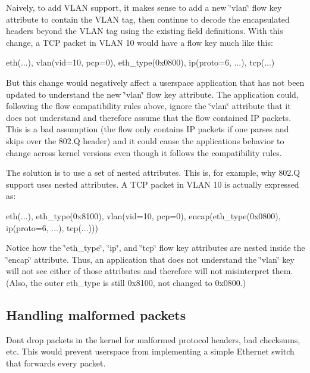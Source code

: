 Naively, to add V\+L\+A\+N support, it makes sense to add a new \char`\"{}vlan\char`\"{} flow key attribute to contain the V\+L\+A\+N tag, then continue to decode the encapsulated headers beyond the V\+L\+A\+N tag using the existing field definitions. With this change, a T\+C\+P packet in V\+L\+A\+N 10 would have a flow key much like this\+: \begin{DoxyVerb}eth(...), vlan(vid=10, pcp=0), eth_type(0x0800), ip(proto=6, ...), tcp(...)
\end{DoxyVerb}


But this change would negatively affect a userspace application that has not been updated to understand the new \char`\"{}vlan\char`\"{} flow key attribute. The application could, following the flow compatibility rules above, ignore the \char`\"{}vlan\char`\"{} attribute that it does not understand and therefore assume that the flow contained I\+P packets. This is a bad assumption (the flow only contains I\+P packets if one parses and skips over the 802.\+Q header) and it could cause the application\textquotesingle{}s behavior to change across kernel versions even though it follows the compatibility rules.

The solution is to use a set of nested attributes. This is, for example, why 802.\+Q support uses nested attributes. A T\+C\+P packet in V\+L\+A\+N 10 is actually expressed as\+: \begin{DoxyVerb}eth(...), eth_type(0x8100), vlan(vid=10, pcp=0), encap(eth_type(0x0800),
ip(proto=6, ...), tcp(...)))
\end{DoxyVerb}


Notice how the \char`\"{}eth\+\_\+type\char`\"{}, \char`\"{}ip\char`\"{}, and \char`\"{}tcp\char`\"{} flow key attributes are nested inside the \char`\"{}encap\char`\"{} attribute. Thus, an application that does not understand the \char`\"{}vlan\char`\"{} key will not see either of those attributes and therefore will not misinterpret them. (Also, the outer eth\+\_\+type is still 0x8100, not changed to 0x0800.)

\subsection*{Handling malformed packets }

Don\textquotesingle{}t drop packets in the kernel for malformed protocol headers, bad checksums, etc. This would prevent userspace from implementing a simple Ethernet switch that forwards every packet.

